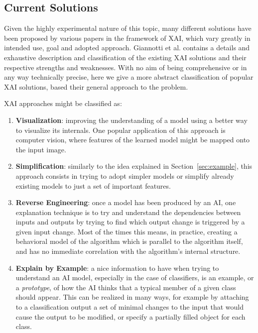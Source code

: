 \documentclass[conference]{IEEEtran}
\newcommand{\cit}{\todo[tickmarkheight=0.2cm]{cit}}
\begin{document}
\subsection{Current Solutions}
\label{sec:solutions}

Given the highly experimental nature of this topic, many different solutions have been proposed by various papers in the framework of XAI, which vary greatly in intended use, goal and adopted approach. Giannotti et al. \cit contains a details and exhaustive description and classification of the existing XAI solutions and their respective strengths and weaknesses. With no aim of being comprehensive or in any way technically precise, here we give a more abstract classification of popular XAI solutions, based their general approach to the problem.

XAI approaches might be classified as:

\begin{enumerate}
    \item \textbf{Visualization}: improving the understanding of a model using a better way to visualize its internals. One popular application of this approach is computer vision, where features of the learned model might be mapped onto the input image. \cit
    \item \textbf{Simplification}: similarly to the idea explained in Section~\ref{sec:example}, this approach consists in trying to adopt simpler models or simplify already existing models to just a set of important features. \cit
    \item \textbf{Reverse Engineering}: once a model has been produced by an AI, one explanation technique is to try and understand the dependencies between inputs and outputs by trying to find which output change is triggered by a given input change. Most of the times this means, in practice, creating a behavioral model of the algorithm which is parallel to the algorithm itself, and has no immediate correlation with the algorithm's internal structure.
    \item \textbf{Explain by Example}: a nice information to have when trying to understand an AI model, especially in the case of classifiers, is an example, or a \textit{prototype}, of how the AI thinks that a typical member of a given class should appear. This can be realized in many ways, for example by attaching to a classification output a set of minimal changes to the input that would cause the output to be modified, or specify a partially filled object for each class.
\end{enumerate}
\end{document}

